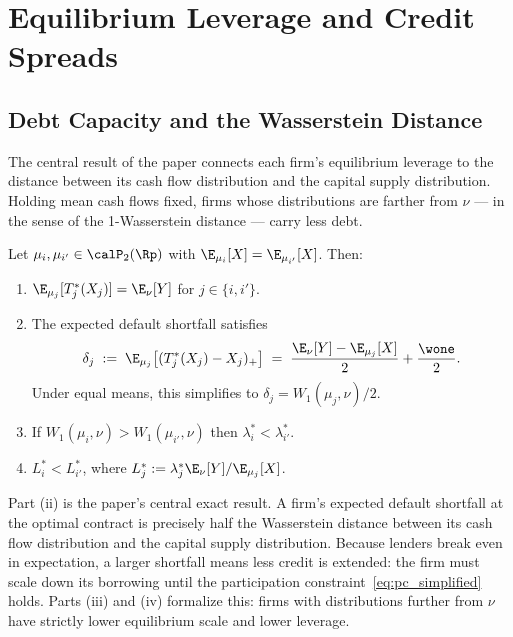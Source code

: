 \section{Equilibrium Leverage and Credit Spreads}
\label{sec:equilibrium}

\subsection{Debt Capacity and the Wasserstein Distance}

The central result of the paper connects each firm's equilibrium leverage to the distance between its cash flow distribution and the capital supply distribution. Holding mean cash flows fixed, firms whose distributions are farther from $\nu$ — in the sense of the 1-Wasserstein distance — carry less debt.

\begin{proposition}
\label{prop:leverage_wasserstein}
Let $\mu_i, \mu_{i'} \in \calP_2(\Rp)$ with $\E_{\mu_i}[X] = \E_{\mu_{i'}}[X]$. Then:
\begin{enumerate}[label=(\roman*)]
  \item $\E_{\mu_j}[T_j^*(X_j)] = \E_\nu[Y]$ for $j \in \{i, i'\}$.
  \item The expected default shortfall satisfies
    \begin{equation}
      \delta_j \;:=\; \E_{\mu_j}\bigl[(T_j^*(X_j)-X_j)_+\bigr] \;=\; \frac{\E_\nu[Y]-\E_{\mu_j}[X]}{2} + \frac{\wone}{2}.
      \label{eq:shortfall_exact}
    \end{equation}
    Under equal means, this simplifies to $\delta_j = W_1(\mu_j,\nu)/2$.
  \item If $W_1(\mu_i,\nu) > W_1(\mu_{i'},\nu)$ then $\lambda_i^* < \lambda_{i'}^*$.
  \item $L_i^* < L_{i'}^*$, where $L_j^* := \lambda_j^* \E_\nu[Y]/\E_{\mu_j}[X]$.
\end{enumerate}
\end{proposition}

Part (ii) is the paper's central exact result. A firm's expected default shortfall at the optimal contract is precisely half the Wasserstein distance between its cash flow distribution and the capital supply distribution. Because lenders break even in expectation, a larger shortfall means less credit is extended: the firm must scale down its borrowing until the participation constraint~\eqref{eq:pc_simplified} holds. Parts (iii) and (iv) formalize this: firms with distributions further from $\nu$ have strictly lower equilibrium scale and lower leverage.

